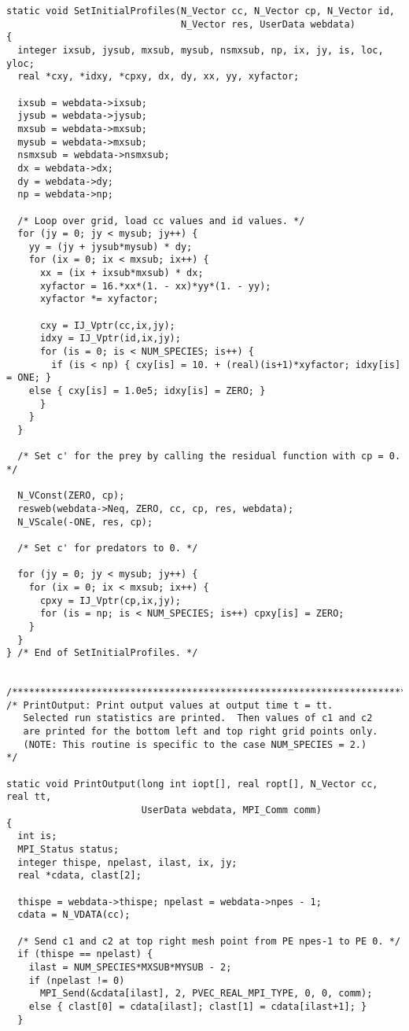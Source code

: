 \begin{verbatim}
static void SetInitialProfiles(N_Vector cc, N_Vector cp, N_Vector id,
                               N_Vector res, UserData webdata)
{
  integer ixsub, jysub, mxsub, mysub, nsmxsub, np, ix, jy, is, loc, yloc;
  real *cxy, *idxy, *cpxy, dx, dy, xx, yy, xyfactor;

  ixsub = webdata->ixsub;
  jysub = webdata->jysub;
  mxsub = webdata->mxsub;
  mysub = webdata->mxsub;
  nsmxsub = webdata->nsmxsub;
  dx = webdata->dx;
  dy = webdata->dy;
  np = webdata->np;

  /* Loop over grid, load cc values and id values. */
  for (jy = 0; jy < mysub; jy++) {
    yy = (jy + jysub*mysub) * dy;
    for (ix = 0; ix < mxsub; ix++) {
      xx = (ix + ixsub*mxsub) * dx;
      xyfactor = 16.*xx*(1. - xx)*yy*(1. - yy);
      xyfactor *= xyfactor;

      cxy = IJ_Vptr(cc,ix,jy); 
      idxy = IJ_Vptr(id,ix,jy); 
      for (is = 0; is < NUM_SPECIES; is++) {
        if (is < np) { cxy[is] = 10. + (real)(is+1)*xyfactor; idxy[is] = ONE; }
	else { cxy[is] = 1.0e5; idxy[is] = ZERO; }
      }
    }
  }

  /* Set c' for the prey by calling the residual function with cp = 0. */

  N_VConst(ZERO, cp);
  resweb(webdata->Neq, ZERO, cc, cp, res, webdata);
  N_VScale(-ONE, res, cp);

  /* Set c' for predators to 0. */

  for (jy = 0; jy < mysub; jy++) {
    for (ix = 0; ix < mxsub; ix++) {
      cpxy = IJ_Vptr(cp,ix,jy); 
      for (is = np; is < NUM_SPECIES; is++) cpxy[is] = ZERO;
    }
  }
} /* End of SetInitialProfiles. */


/*************************************************************************/
/* PrintOutput: Print output values at output time t = tt.
   Selected run statistics are printed.  Then values of c1 and c2
   are printed for the bottom left and top right grid points only.
   (NOTE: This routine is specific to the case NUM_SPECIES = 2.)         */

static void PrintOutput(long int iopt[], real ropt[], N_Vector cc, real tt,
                        UserData webdata, MPI_Comm comm)
{
  int is;
  MPI_Status status;
  integer thispe, npelast, ilast, ix, jy;
  real *cdata, clast[2];

  thispe = webdata->thispe; npelast = webdata->npes - 1;
  cdata = N_VDATA(cc);

  /* Send c1 and c2 at top right mesh point from PE npes-1 to PE 0. */
  if (thispe == npelast) {
    ilast = NUM_SPECIES*MXSUB*MYSUB - 2;
    if (npelast != 0)
      MPI_Send(&cdata[ilast], 2, PVEC_REAL_MPI_TYPE, 0, 0, comm);
    else { clast[0] = cdata[ilast]; clast[1] = cdata[ilast+1]; }
  }


\end{verbatim}
